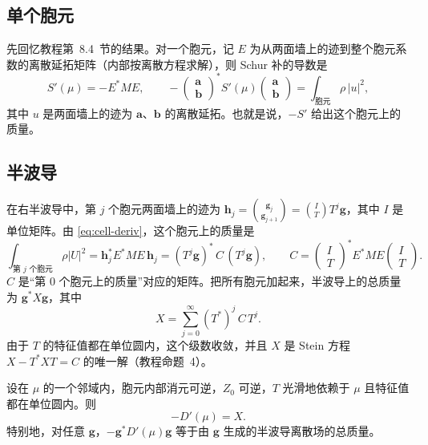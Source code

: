 \documentclass[11pt,a4paper,fontset=fandol]{ctexart}
\begin{document}
\subsection{单个胞元}

先回忆教程第~8.4~节的结果。对一个胞元，记 $E$ 为从两面墙上的迹到整个胞元系数的离散延拓矩阵（内部按离散方程求解），则 Schur 补的导数是
\begin{equation}
\label{eq:cell-deriv}
S'(\mu)=-E^*ME,\qquad
-\begin{pmatrix}\bm a\\ \bm b\end{pmatrix}^{\!*}S'(\mu)\begin{pmatrix}\bm a\\ \bm b\end{pmatrix}=\int_{\text{胞元}}\rho\,|u|^2 ,
\end{equation}
其中 $u$ 是两面墙上的迹为 $\bm a$、$\bm b$ 的离散延拓。也就是说，$-S'$ 给出这个胞元上的质量。

\subsection{半波导}

在右半波导中，第 $j$ 个胞元两面墙上的迹为 $\bm h_j=\binom{\bm g_j}{\bm g_{j+1}}=\binom{I}{T}T^j\bm g$，其中 $I$ 是单位矩阵。由 \eqref{eq:cell-deriv}，这个胞元上的质量是
\[
\int_{\text{第 }j\text{ 个胞元}}\rho|U|^2=\bm h_j^*E^*ME\,\bm h_j=(T^j\bm g)^*\,C\,(T^j\bm g),\qquad
C=\begin{pmatrix}I\\ T\end{pmatrix}^{\!*}E^*ME\begin{pmatrix}I\\ T\end{pmatrix}.
\]
$C$ 是“第 0 个胞元上的质量”对应的矩阵。把所有胞元加起来，半波导上的总质量为 $\bm g^*X\bm g$，其中
\begin{equation}
\label{eq:X}
X=\sum_{j=0}^\infty(T^*)^j\,C\,T^j .
\end{equation}
由于 $T$ 的特征值都在单位圆内，这个级数收敛，并且 $X$ 是 Stein 方程 $X-T^*XT=C$ 的唯一解（教程命题~4）。

\begin{proposition}[半波导的导数等于质量]
\label{prop:D-deriv}
设在 $\mu$ 的一个邻域内，胞元内部消元可逆，$Z_0$ 可逆，$T$ 光滑地依赖于 $\mu$ 且特征值都在单位圆内。则
\[
-D'(\mu)=X .
\]
特别地，对任意 $\bm g$，$-\bm g^*D'(\mu)\bm g$ 等于由 $\bm g$ 生成的半波导离散场的总质量。
\end{proposition}
\end{document}
